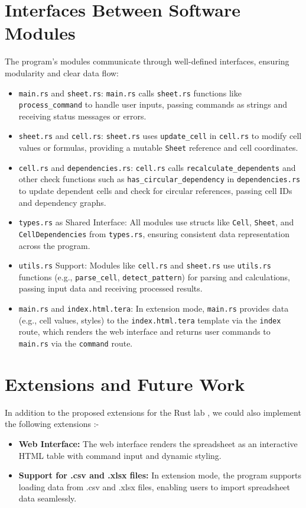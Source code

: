 \documentclass[12pt]{article}
\begin{document}
\section{Interfaces Between Software Modules}
The program’s modules communicate through well-defined interfaces, ensuring modularity and clear data flow:
\begin{itemize}
    \item \texttt{main.rs} and \texttt{sheet.rs}: \texttt{main.rs} calls \texttt{sheet.rs} functions like \texttt{process\_command} to handle user inputs, passing commands as strings and receiving status messages or errors.
    \item \texttt{sheet.rs} and \texttt{cell.rs}: \texttt{sheet.rs} uses \texttt{update\_cell} in \texttt{cell.rs} to modify cell values or formulas, providing a mutable \texttt{Sheet} reference and cell coordinates.
    \item \texttt{cell.rs} and \texttt{dependencies.rs}: \texttt{cell.rs} calls \texttt{recalculate\_dependents} and other check functions such as \texttt{has\_circular\_dependency} in \texttt{dependencies.rs} to update dependent cells and check for circular references, passing cell IDs and dependency graphs.
    \item \texttt{types.rs} as Shared Interface: All modules use structs like \texttt{Cell}, \texttt{Sheet}, and \texttt{CellDependencies} from \texttt{types.rs}, ensuring consistent data representation across the program.
    \item \texttt{utils.rs} Support: Modules like \texttt{cell.rs} and \texttt{sheet.rs} use \texttt{utils.rs} functions (e.g., \texttt{parse\_cell}, \texttt{detect\_pattern}) for parsing and calculations, passing input data and receiving processed results.
    \item \texttt{main.rs} and \texttt{index.html.tera}: In extension mode, \texttt{main.rs} provides data (e.g., cell values, styles) to the \texttt{index.html.tera} template via the \texttt{index} route, which renders the web interface and returns user commands to \texttt{main.rs} via the \texttt{command} route.
\end{itemize}

\section{Extensions and Future Work}
In addition to the proposed extensions for the Rust lab , we could also implement the following extensions :-
\begin{itemize}
 \item\textbf{Web Interface:} The web interface renders the spreadsheet as an interactive HTML table with command input and dynamic styling.
 \item\textbf{Support for .csv and .xlsx files:} In extension mode, the program supports loading data from .csv and .xlsx files, enabling users to import spreadsheet data seamlessly.
\end{itemize}
\end{document}
